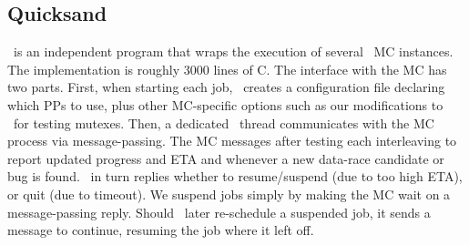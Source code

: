 \subsection{Quicksand}

\quicksand~is an independent program that wraps the execution of several \landslide~MC instances.
The implementation is roughly 3000 lines of C.
The interface with the MC has two parts. %
First, when starting each job, \quicksand~creates a configuration file declaring which PPs to use,
plus other MC-specific options such as our modifications to \landslide~for testing mutexes. %
Then, a dedicated \quicksand~thread communicates with the MC process via message-passing. %
The MC messages after testing each interleaving to report updated progress and ETA
and whenever a new data-race candidate or bug is found.
\quicksand~in turn replies whether to resume/suspend (due to too high ETA), or quit (due to timeout).
We suspend jobs simply by making the MC wait on a message-passing reply.
Should \quicksand~later re-schedule a suspended job, it sends a message to continue,
resuming the job where it left off.
